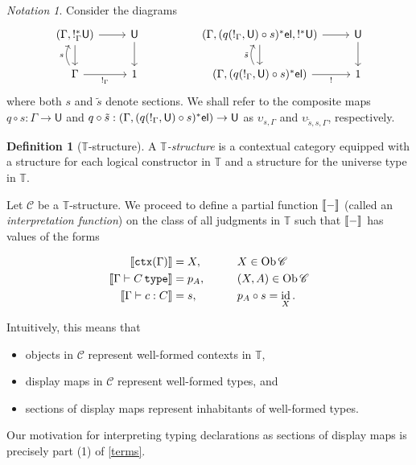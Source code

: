 \documentclass[10pt,letterpaper,cm]{nupset}
\theoremstyle{definition}
\newtheorem{definition}{Definition}[subsection]
\theoremstyle{theorem}
\theoremstyle{remark}
\newtheorem*{notation}{Notation}
\DeclareMathOperator{\ob}{Ob}
\newcommand{\U}{\mathsf{U}}
\newcommand{\el}{\mathsf{el}}
\newcommand{\0}{\mathbf{0}}
\newcommand{\1}{\mathbf{1}}
\newcommand{\2}{\mathbf{2}}
\DeclareMathOperator{\ctx}{\mathtt{ctx}}
\DeclareMathOperator{\type}{\mathtt{type}}
\renewcommand{\c}{\mathscr{C}}
\newcommand{\T}{\mathbb T}
\DeclareMathOperator{\idd}{id}
\newcommand{\bi}{\begin{itemize}}
\newcommand{\ei}{\end{itemize}}
\begin{document}
\begin{notation} 
Consider the diagrams
\[
\begin{tikzcd}
{\mleft(\Gamma, !_\Gamma^{\ast}{\U}\mright)} \arrow[r] \arrow[d] & \U \arrow[d] &  & {\mleft(\Gamma, (q(!_\Gamma, \U)\circ s)^{\ast}{\el}, !^{\ast}{\U}\mright)} \arrow[d] \arrow[r]                  & \U \arrow[d] \\
\Gamma \arrow[r, "!_\Gamma"'] \arrow[u, "s", bend left]       & 1            &  & {\mleft(\Gamma, (q(!_\Gamma, \U)\circ s)^{\ast}{\el}\mright)} \arrow[r, "!"'] \arrow[u, "\tilde{s}", bend left] & 1          
\end{tikzcd}
\] where both $s$ and $\tilde{s}$ denote sections. We shall refer to the composite maps $q\circ s : \Gamma \to \U$ and $q\circ \tilde{s} : \mleft(\Gamma, (q(!_\Gamma, \U)\circ s)^{\ast}{\el}\mright) \to \U$ as $\upsilon_{s, \Gamma}$ and $\upsilon_{\tilde{s}, s, \Gamma}$, respectively. 
\end{notation}

\begin{definition}[$\T$-structure]\label{model1}
A \textit{$\T$-structure} is a contextual category equipped with a structure for each logical constructor in $\T$ and a structure for the universe type in $\T$.
\end{definition}

Let $\c$ be a $\T$-structure. We proceed to define a partial function $\mleft\llbracket{-}\mright\rrbracket$ (called an \textit{interpretation function}) on the class of all judgments in $\T$\label{intfunct} such that  $\mleft\llbracket{-}\mright\rrbracket$  has values of the forms

\begin{alignat*}{2}
\mleft\llbracket{\ctx(\Gamma)}\mright\rrbracket & = X, \qquad && X\in \ob{\c}
\\  \mleft\llbracket{\Gamma \vdash C \type}\mright\rrbracket & = p_{A}, \qquad && \mleft(X, A\mright) \in \ob{\c}
\\ \mleft\llbracket{\Gamma \vdash c :C}\mright\rrbracket  & =  s, \qquad && p_A \circ s = \idd_X.
\end{alignat*}

Intuitively, this means that 
\bi
\item objects in $\c$ represent well-formed contexts in $\T$,
\item display maps in $\c$ represent well-formed types, and
\item sections of display maps represent inhabitants of well-formed types.
\ei  Our motivation for interpreting typing declarations as sections of display maps is precisely part (1) of \cref{terms}. 
\end{document}
